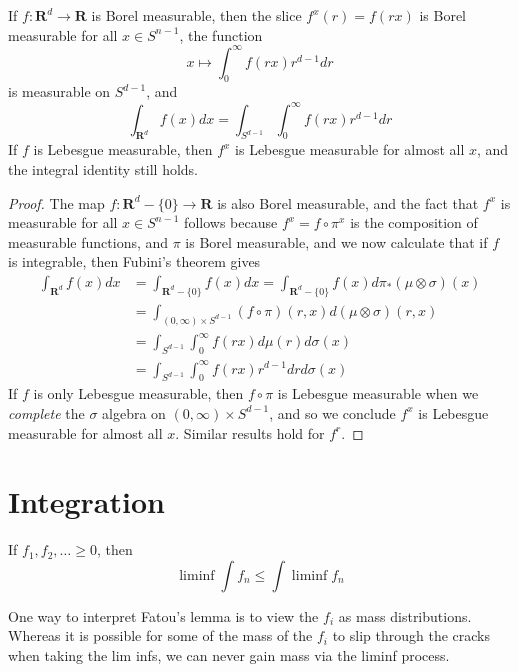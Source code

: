 \begin{theorem}
    If $f: \mathbf{R}^d \to \mathbf{R}$ is Borel measurable, then the slice $f^x(r) = f(rx)$ is Borel measurable for all $x \in S^{n-1}$, the function
    \[ x \mapsto \int_0^\infty f(rx) r^{d-1}dr \]
    is measurable on $S^{d-1}$, and
    \[ \int_{\mathbf{R}^d} f(x) dx = \int_{S^{d-1}} \int_0^\infty f(rx) r^{d-1} dr \]
    If $f$ is Lebesgue measurable, then $f^x$ is Lebesgue measurable for almost all $x$, and the integral identity still holds.
\end{theorem}
\begin{proof}
    The map $f: \mathbf{R}^d - \{ 0 \} \to \mathbf{R}$ is also Borel measurable, and the fact that $f^x$ is measurable for all $x \in S^{n-1}$ follows because $f^x = f \circ \pi^x$ is the composition of measurable functions, and $\pi$ is Borel measurable, and we now calculate that if $f$ is integrable, then Fubini's theorem gives
    \begin{align*}
        \int_{\mathbf{R}^d} f(x) dx &= \int_{\mathbf{R}^d - \{ 0 \}} f(x) dx = \int_{\mathbf{R}^d - \{ 0 \}} f(x) d\pi_*(\mu \otimes \sigma)(x)\\
        &= \int_{(0,\infty) \times S^{d-1}} (f \circ \pi)(r,x) d(\mu \otimes \sigma)(r,x)\\
        &= \int_{S^{d-1}} \int_0^\infty f(rx) d\mu(r) d\sigma(x)\\
        &= \int_{S^{d-1}} \int_0^\infty f(rx) r^{d-1} dr d\sigma(x)
    \end{align*}
    If $f$ is only Lebesgue measurable, then $f \circ \pi$ is Lebesgue measurable when we {\it complete} the $\sigma$ algebra on $(0,\infty) \times S^{d-1}$, and so we conclude $f^x$ is Lebesgue measurable for almost all $x$. Similar results hold for $f^r$.
\end{proof}

\chapter{Integration}

\begin{lemma}[Fatou]
    If $f_1, f_2, \dots \geq 0$, then
    \[ \liminf \int f_n \leq \int \liminf f_n \]
\end{lemma}

One way to interpret Fatou's lemma is to view the $f_i$ as mass distributions. Whereas it is possible for some of the mass of the $f_i$ to slip through the cracks when taking the lim infs, we can never gain mass via the liminf process.


